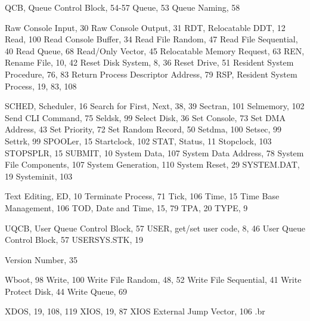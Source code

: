 QCB, Queue Control Block, 54-57
Queue, 53
Queue Naming, 58

Raw Console Input, 30
Raw Console Output, 31
RDT, Relocatable DDT, 12
Read, 100
Read Console Buffer, 34
Read File Random, 47
Read File Sequential, 40
Read Queue, 68
Read/Only Vector, 45
Relocatable Memory Request, 63
REN, Rename File, 10, 42
Reset Disk System, 8, 36
Reset Drive, 51
Resident System Procedure, 76, 83
Return Process Descriptor Address, 79
RSP, Resident System Process, 19, 83, 108

SCHED, Scheduler, 16
Search for First, Next, 38, 39
Sectran, 101
Selmemory, 102
Send CLI Command, 75
Seldsk, 99
Select Disk, 36
Set Console, 73
Set DMA Address, 43
Set Priority, 72
Set Random Record, 50
Setdma, 100
Setsec, 99
Settrk, 99
SPOOLer, 15
Startclock, 102
STAT, Status, 11
Stopclock, 103
STOPSPLR, 15
SUBMIT, 10
System Data, 107
System Data Address, 78
System File Components, 107
System Generation, 110
System Reset, 29
SYSTEM.DAT, 19
Systeminit, 103

Text Editing, ED, 10
Terminate Process, 71
Tick, 106
Time, 15
Time Base Management, 106
TOD, Date and Time, 15, 79
TPA, 20
TYPE, 9

UQCB, User Queue Control Block, 57
USER, get/set user code, 8, 46
User Queue Control Block, 57
USERSYS.STK, 19

Version Number, 35

Wboot, 98
Write, 100
Write File Random, 48, 52
Write File Sequential, 41
Write Protect Disk, 44
Write Queue, 69

XDOS, 19, 108, 119
XIOS, 19, 87
XIOS External Jump Vector, 106
.br

